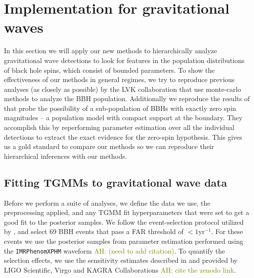 \documentclass[twocolumn,usenames,dvipsnames,linenumbers]{aastex631}
\newcommand{\asad}[1]{\textcolor{olive}{AH: #1}}
\begin{document}
\section{Implementation for gravitational waves}
In this section we will apply our new methods to hierarchically analyze gravitational wave detections to look for features in the population distributions of black hole spins, which consist of bounded parameters. To show the effectiveness of our methods in general regimes, we try to reproduce previous analyses (as closely as possible) by the LVK collaboration that use monte-carlo methods to analyze the BBH population. Additionally we reproduce the results of \cite{Tong2022} that probe the possibility of a sub-population of BBHs with exactly zero spin magnitudes -- a population model with compact support at the boundary. They accomplish this by reperforming parameter estimation over all the individual detections to extract the exact evidence for the zero-spin hypothesis. This gives us a gold standard to compare our methods so we can reproduce their hierarchical inferences with our methods.

\subsection{Fitting TGMMs to gravitational wave data}

Before we perform a suite of analyses, we define the data we use, the preprocessing applied, and any TGMM fit hyperparameters that were set to get a good fit to the posterior samples. We follow the event-selection protocol utilized by \cite{LVKPop}, and select 69 BBH events that pass a FAR threshold of $< 1 \text{yr}^{-1}$. For these events we use the posterior samples from parameter estimation performed using the \texttt{IMRPhenomXPHM} waveform \asad{(need to add citation)}. To quantify the selection effects, we use the sensitivity estimates described in \cite{LVKPop} and provided by LIGO Scientific, Virgo and KAGRA Collaborations \asad{cite the zenodo link}. 
\end{document}
